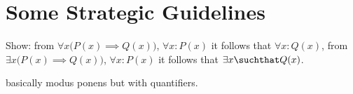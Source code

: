 \section{Some Strategic Guidelines}

\begin{Exercise} [number=25]
    Show:
    \Question from $\forall{x}\bigl(P(x) \implies Q(x)\bigr)$, $\forall{x} \colon P(x)$ it follows that $\forall{x} \colon Q(x)$,
    \Question from $\exists{x}\bigl(P(x) \implies Q(x)\bigr)$, $\forall{x} \colon P(x)$ it follows that $\exists{x} \suchthat Q(x)$.
\end{Exercise}

\begin{Answer} [number=25.1]
    \begin{structured_derivation}
        \begin{nested_derivation}
            basically modus ponens but with quantifiers. 
        \end{nested_derivation}
    \end{structured_derivation}
\end{Answer}